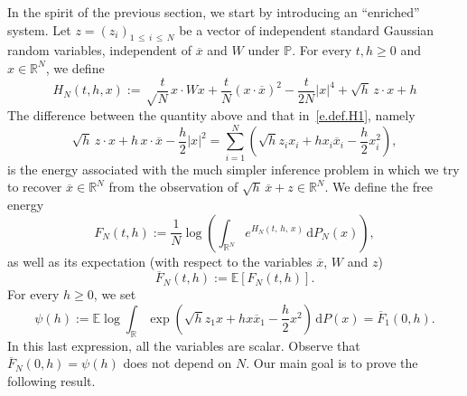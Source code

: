 \documentclass[AHL,Unicode,longabstracts,published]{cedram}
\newcommand{\R}{\mathbb{R}}
\newcommand{\E}{\mathbb{E}}
\renewcommand{\P}{\mathbb{P}}
\renewcommand{\d}{\mathrm{d}}
\newcommand{\1}{\mathds{1}}
\renewcommand{\le}{\leqslant}
\renewcommand{\ge}{\geqslant}
\renewcommand{\bar}{\overline}
\begin{document}
In the spirit of the previous section, we start by introducing an ``enriched'' system. Let $z = (z_i)_{1\,\le\, i\,\le\,N}$ be a vector of independent standard Gaussian random variables, independent of $\bar x$ and $W$ under $\P$. For every $t, {h} \ge 0$ and $x \in \R^N$, we define
\[
H_N(t,{h},x) :=
\sqrt \frac t N\, x \cdot W x + \frac t N (x \cdot \bar x)^2 - \frac t {2N} |x|^4 + \sqrt{h} \, z \cdot x + {h} \]
The difference between the quantity above and that in~\eqref{e.def.H1}, namely
\[
\sqrt{h} \, z \cdot x + {h} \, x \cdot \bar x - \frac {h} 2 |x|^2 = \sum_{i = 1}^N \left(\sqrt{{h}} z_i x_i + {h} x_i \bar x_i - \frac {h} 2 x_i^2\right),
\]
is the energy associated with the much simpler inference problem in which we try to recover $\bar x \in \R^N$ from the observation of $\sqrt {h} \, \bar x + z \in \R^N$. We define the free energy
\begin{equation}\label{e.enriched.free.energy}
F_N(t,{h}) := \frac 1 N \log\left(\int_{\R^N} e^{ H_N(t,\,{h},\,x)} \, \d P_N(x) \right),
\end{equation}
as well as its expectation (with respect to the variables $\bar x$, $W$ and $z$)
\begin{equation}\label{e.expectation.free.energy}
\bar F_N(t,{h}) := \E \left[F_N(t,h) \right].
\end{equation}
For every $h \ge 0$, we set
\begin{equation}\label{e.def.psi}
\psi({h}) := \E \log \int_\R \exp\left(\sqrt{h} z_1 x +h x \bar x_1 - \frac h 2 x^2 \right) \, \d P(x) = \bar F_1(0,h).
\end{equation}
In this last expression, all the variables are scalar. Observe that $\bar F_N(0,h) = \psi(h)$ does not depend on $N$. Our main goal is to prove the following result.
\end{document}
